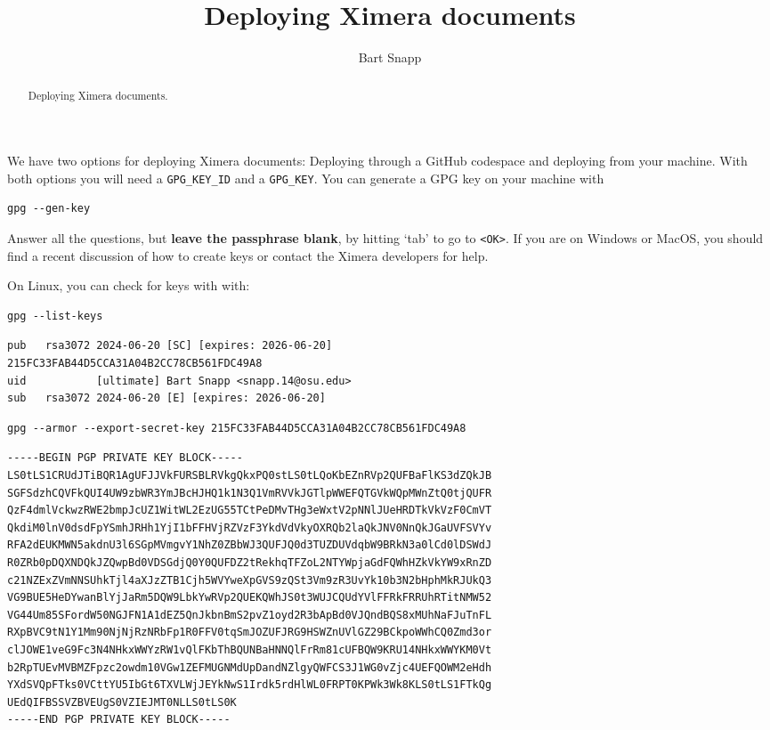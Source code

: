 \documentclass{ximera}
\title{Deploying Ximera documents}
\author{Bart Snapp}
\begin{document}
\pdfOnly{\onecolumn}
\begin{abstract}
    Deploying Ximera documents.
\end{abstract}
\maketitle
\begin{multicols}{2}
    We have two options for deploying Ximera documents: Deploying through a
    GitHub
    codespace and deploying from your machine. With both options you will need
    a
    \verb!GPG_KEY_ID! and a \verb!GPG_KEY!. 
    You can generate a GPG key on your machine with
    \begin{verbatim}
gpg --gen-key
\end{verbatim}
    Answer all the questions, but \textbf{leave the passphrase blank}, by hitting
    `tab' to go to \verb!<OK>!.
    If you are on Windows or MacOS, you should find a recent discussion of how to
    create keys or contact the Ximera developers for help.

    On Linux, you can check for keys with
    with:
    \begin{verbatim}
gpg --list-keys
\end{verbatim}


\begin{verbatim}
pub   rsa3072 2024-06-20 [SC] [expires: 2026-06-20]
215FC33FAB44D5CCA31A04B2CC78CB561FDC49A8
uid           [ultimate] Bart Snapp <snapp.14@osu.edu>
sub   rsa3072 2024-06-20 [E] [expires: 2026-06-20]
\end{verbatim}


\begin{verbatim}
gpg --armor --export-secret-key 215FC33FAB44D5CCA31A04B2CC78CB561FDC49A8
\end{verbatim}

\begin{verbatim}
-----BEGIN PGP PRIVATE KEY BLOCK-----
LS0tLS1CRUdJTiBQR1AgUFJJVkFURSBLRVkgQkxPQ0stLS0tLQoKbEZnRVp2QUFBaFlKS3dZQkJB
SGFSdzhCQVFkQUI4UW9zbWR3YmJBcHJHQ1k1N3Q1VmRVVkJGTlpWWEFQTGVkWQpMWnZtQ0tjQUFR
QzF4dmlVckwzRWE2bmpJcUZ1WitWL2EzUG55TCtPeDMvTHg3eWxtV2pNNlJUeHRDTkVkVzF0CmVT
QkdiM0lnV0dsdFpYSmhJRHh1YjI1bFFHVjRZVzF3YkdVdVkyOXRQb2laQkJNV0NnQkJGaUVFSVYv
RFA2dEUKMWN5akdnU3l6SGpMVmgvY1NhZ0ZBbWJ3QUFJQ0d3TUZDUVdqbW9BRkN3a0lCd0lDSWdJ
R0ZRb0pDQXNDQkJZQwpBd0VDSGdjQ0Y0QUFDZ2tRekhqTFZoL2NTYWpjaGdFQWhHZkVkYW9xRnZD
c21NZExZVmNNSUhkTjl4aXJzZTB1Cjh5WVYweXpGVS9zQSt3Vm9zR3UvYk10b3N2bHphMkRJUkQ3
VG9BUE5HeDYwanBlYjJaRm5DQW9LbkYwRVp2QUEKQWhJS0t3WUJCQUdYVlFFRkFRRUhRTitNMW52
VG44Um85SFordW50NGJFN1A1dEZ5QnJkbnBmS2pvZ1oyd2R3bApBd0VJQndBQS8xMUhNaFJuTnFL
RXpBVC9tN1Y1Mm90NjNjRzNRbFp1R0FFV0tqSmJOZUFJRG9HSWZnUVlGZ29BCkpoWWhCQ0Zmd3or
clJOWE1veG9Fc3N4NHkxWWYzRW1vQlFKbThBQUNBaHNNQlFrRm81cUFBQW9KRU14NHkxWWYKM0Vt
b2RpTUEvMVBMZFpzc2owdm10VGw1ZEFMUGNMdUpDandNZlgyQWFCS3J1WG0vZjc4UEFQOWM2eHdh
YXdSVQpFTks0VCttYU5IbGt6TXVLWjJEYkNwS1Irdk5rdHlWL0FRPT0KPWk3Wk8KLS0tLS1FTkQg
UEdQIFBSSVZBVEUgS0VZIEJMT0NLLS0tLS0K
-----END PGP PRIVATE KEY BLOCK-----
\end{verbatim}




\end{multicols}
\end{document}
